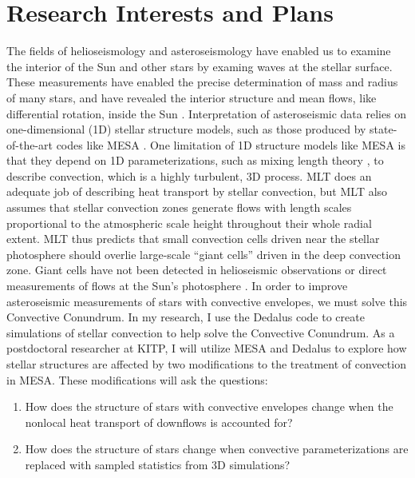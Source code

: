 \documentclass[preprint, hmargin=1in, vmargin=1in]{aastex62}
\begin{document}
\maketitle
\vspace{-88pt}
\section*{\textbf{Research Interests and Plans}}
\thispagestyle{fancy}
The fields of helioseismology and asteroseismology have enabled us to examine the interior of the Sun and other stars by examing waves at the stellar surface.
These measurements have enabled the precise determination of mass and radius of many stars, and have revealed the interior structure and mean flows, like differential rotation, inside the Sun \citep{huber&all2019, christensen-dalsgaard2002}.
Interpretation of asteroseismic data relies on one-dimensional (1D) stellar structure models, such as those produced by state-of-the-art codes like MESA \citep[e.g.,][]{paxton&all2011, paxton&all2019}.
One limitation of 1D structure models like MESA is that they depend on 1D parameterizations, such as mixing length theory \citep[MLT,][]{bohm-vitense1958}, to describe convection, which is a highly turbulent, 3D process.
MLT does an adequate job of describing heat transport by stellar convection, but MLT also assumes that stellar convection zones generate flows with length scales proportional to the atmospheric scale height throughout their whole radial extent.
MLT thus predicts that small convection cells driven near the stellar photosphere should overlie large-scale ``giant cells'' driven in the deep convection zone.
Giant cells have not been detected in helioseismic observations or direct measurements of flows at the Sun's photosphere \citep{hanasoge&all2015, hathaway&all2015}.
In order to improve asteroseismic measurements of stars with convective envelopes, we must solve this Convective Conundrum.
In my research, I use the Dedalus code \citep{burns&all2019} to create simulations of stellar convection to help solve the Convective Conundrum.
As a postdoctoral researcher at KITP, I will utilize MESA and Dedalus to explore how stellar structures are affected by two modifications to the treatment of convection in MESA.
These modifications will ask the questions:
\begin{enumerate}
\item How does the structure of stars with convective envelopes change when the nonlocal heat transport of downflows is accounted for?
\item How does the structure of stars change when convective parameterizations are replaced with sampled statistics from 3D simulations?
\end{enumerate}
\end{document}
